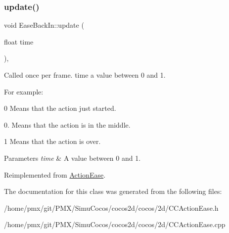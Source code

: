 \mbox{\label{classEaseBackIn_a6c053160bd8e0c98f23b1dd3acbc527c}} 
\subsubsection{\texorpdfstring{update()}{update()}}
{\footnotesize\ttfamily void Ease\+Back\+In\+::update (\begin{DoxyParamCaption}\item[{float}]{time }\end{DoxyParamCaption})\hspace{0.3cm}{\ttfamily [override]}, {\ttfamily [virtual]}}

Called once per frame. time a value between 0 and 1.

For example\+:
\begin{DoxyItemize}
\item 0 Means that the action just started.
\item 0. Means that the action is in the middle.
\item 1 Means that the action is over.
\end{DoxyItemize}


\begin{DoxyParams}{Parameters}
{\em time} & A value between 0 and 1. \\
\hline
\end{DoxyParams}


Reimplemented from \hyperlink{classActionEase_a77679f09c02cf75fb54776470c339fc5}{Action\+Ease}.



The documentation for this class was generated from the following files\+:\begin{DoxyCompactItemize}
\item 
/home/pmx/git/\+P\+M\+X/\+Simu\+Cocos/cocos2d/cocos/2d/C\+C\+Action\+Ease.\+h\item 
/home/pmx/git/\+P\+M\+X/\+Simu\+Cocos/cocos2d/cocos/2d/C\+C\+Action\+Ease.\+cpp\end{DoxyCompactItemize}
